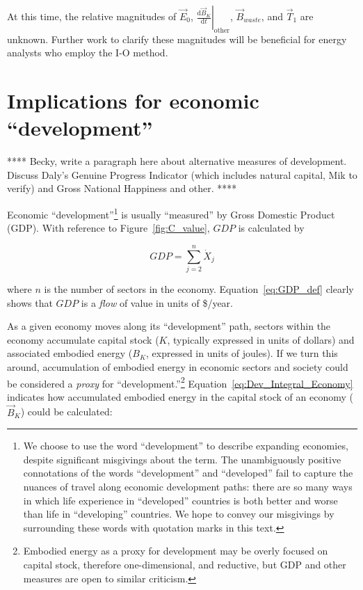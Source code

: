 At this time, the relative magnitudes of $\vec{E}_{0}$,
$\left. \frac{\mathrm{d}\vec{B}_{K}}{\mathrm{d}t} \right|_{\mathrm{other}}$,
$\vec{B}_{waste}$, and $\vec{T}_{1}$ are unknown. 
Further work to clarify these magnitudes will be beneficial
for energy analysts who employ the I-O method.
 

\section{Implications for economic ``development''}
\label{sec:implications_for_development}

**** Becky, write a paragraph here about alternative measures of development. 
Discuss Daly's Genuine Progress Indicator (which includes natural capital, Mik to verify)
and Gross National Happiness and other. ****

Economic ``development''\footnote{We choose to use the word ``development'' to
describe expanding economies, despite significant misgivings about the term. 
The unambiguously positive connotations of the words ``development'' and ``developed''
fail to capture the nuances of travel along economic development paths:
there are so many ways in which life experience in ``developed'' countries 
is both better and worse than life in ``developing'' countries.
We hope to convey our misgivings by surrounding these words with quotation marks in this text.}
is usually ``measured''
by Gross Domestic Product (GDP).
With reference to Figure~\ref{fig:C_value}, $GDP$ is calculated by

\begin{equation} \label{eq:GDP_def}
	GDP
	= \sum\limits_{j=2}^{n} \dot{X}_{j}
\end{equation}

\noindent{}where $n$ is the number of sectors in the economy.
Equation~\ref{eq:GDP_def} clearly shows that 
$GDP$ is a \emph{flow} of value in units of \$/year.

As a given economy moves along its ``development'' path,
sectors within the economy accumulate capital stock 
($K$, typically expressed in units of dollars)
and associated embodied energy 
($B_{K}$, expressed in units of joules).
If we turn this around, 
accumulation of embodied energy in economic sectors and society 
could be considered a \emph{proxy} for ``development.''\footnote{Embodied energy 
as a proxy for development may be overly focused on capital stock, 
therefore one-dimensional, and reductive, 
but GDP and other measures are open to similar criticism.}
Equation~\ref{eq:Dev_Integral_Economy} indicates how accumulated
embodied energy in the capital stock 
of an economy ($\vec{B}_{K}$) could be calculated:

